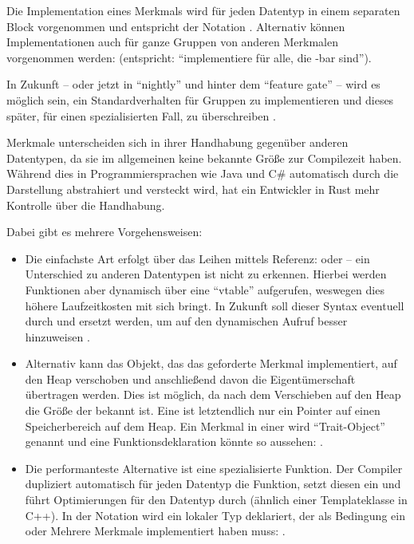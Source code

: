 Die Implementation eines Merkmals wird für jeden Datentyp in einem separaten Block vorgenommen und entspricht der Notation .
Alternativ können Implementationen auch für ganze Gruppen von anderen Merkmalen vorgenommen werden:  (entspricht: \enquote{implementiere  für alle, die -bar sind}).

In Zukunft -- oder jetzt in \enquote{nightly} und hinter dem \enquote{feature gate}  -- wird es möglich sein, ein Standardverhalten für Gruppen zu implementieren und dieses später, für einen spezialisierten Fall, zu überschreiben \cite{rust:github:specialization}.

Merkmale unterscheiden sich in ihrer Handhabung gegenüber anderen Datentypen, da sie im allgemeinen keine bekannte Größe zur Compilezeit haben.
Während dies in Programmiersprachen wie Java und C\# automatisch durch die Darstellung abstrahiert und versteckt wird, hat ein Entwickler in Rust mehr Kontrolle über die Handhabung.

Dabei gibt es mehrere Vorgehensweisen:
\begin{itemize}
	\item Die einfachste Art erfolgt über das Leihen mittels Referenz:  oder  -- ein Unterschied zu anderen Datentypen ist nicht zu erkennen.
	Hierbei werden Funktionen aber dynamisch über eine \enquote{vtable} aufgerufen, weswegen dies höhere Laufzeitkosten mit sich bringt.
	In Zukunft soll dieser Syntax eventuell durch  und  ersetzt werden, um auf den dynamischen Aufruf besser hinzuweisen \cite{rust:github:dyn}.
	
	\item Alternativ kann das Objekt, das das geforderte Merkmal implementiert, auf den Heap verschoben und anschließend davon die Eigentümerschaft übertragen werden.
	Dies ist möglich, da nach dem Verschieben auf den Heap die Größe der  bekannt ist.
	Eine  ist letztendlich nur ein Pointer auf einen Speicherbereich auf dem Heap.
	Ein Merkmal in einer  wird \enquote{Trait-Object} genannt und eine Funktionsdeklaration könnte so aussehen: .
	
	\item Die performanteste Alternative ist eine spezialisierte Funktion.
	Der Compiler dupliziert automatisch für jeden Datentyp die Funktion, setzt diesen ein und führt Optimierungen für den Datentyp durch (ähnlich einer Templateklasse in C++).
	In der Notation wird ein lokaler Typ deklariert, der als Bedingung ein oder Mehrere Merkmale implementiert haben muss: .
\end{itemize}

